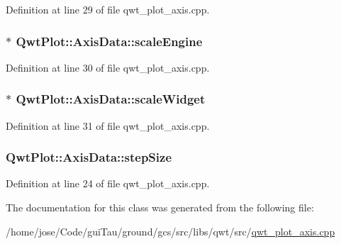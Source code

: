 Definition at line 29 of file qwt\-\_\-plot\-\_\-axis.\-cpp.

\hypertarget{class_qwt_plot_1_1_axis_data_a068e9476a04fdb1905f7c387d4d33c66}{
\subsubsection[{scale\-Engine}]{$\ast$ Qwt\-Plot\-::\-Axis\-Data\-::scale\-Engine}}\label{class_qwt_plot_1_1_axis_data_a068e9476a04fdb1905f7c387d4d33c66}


Definition at line 30 of file qwt\-\_\-plot\-\_\-axis.\-cpp.

\hypertarget{class_qwt_plot_1_1_axis_data_a98b3716a5d277081812dcc4a2cec23a5}{
\subsubsection[{scale\-Widget}]{$\ast$ Qwt\-Plot\-::\-Axis\-Data\-::scale\-Widget}}\label{class_qwt_plot_1_1_axis_data_a98b3716a5d277081812dcc4a2cec23a5}


Definition at line 31 of file qwt\-\_\-plot\-\_\-axis.\-cpp.

\hypertarget{class_qwt_plot_1_1_axis_data_a64c8250b9cb2adf93aa7beda7ffcc257}{
\subsubsection[{step\-Size}]{ Qwt\-Plot\-::\-Axis\-Data\-::step\-Size}}\label{class_qwt_plot_1_1_axis_data_a64c8250b9cb2adf93aa7beda7ffcc257}


Definition at line 24 of file qwt\-\_\-plot\-\_\-axis.\-cpp.



The documentation for this class was generated from the following file\-:\begin{DoxyCompactItemize}
\item 
/home/jose/\-Code/gui\-Tau/ground/gcs/src/libs/qwt/src/\hyperlink{qwt__plot__axis_8cpp}{qwt\-\_\-plot\-\_\-axis.\-cpp}\end{DoxyCompactItemize}
